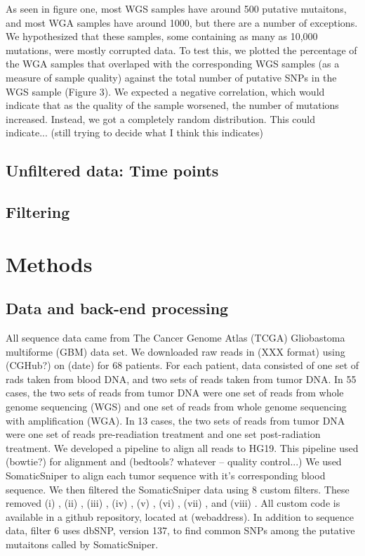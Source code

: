 \documentclass[11pt]{article} %
\begin{document}
As seen in figure one, most WGS samples have around 500 putative mutaitons, and most WGA samples have around 1000, but there are a number of exceptions. We hypothesized that these samples, some containing as many as 10,000 mutations, were mostly corrupted data. To test this, we plotted the percentage of the WGA samples that overlaped with the corresponding WGS samples (as a measure of sample quality) against the total number of putative SNPs in the WGS sample (Figure 3). We expected a negative correlation, which would indicate that as the quality of the sample worsened, the number of mutations increased. Instead, we got a completely random distribution. This could indicate... (still trying to decide what I think this indicates)

\subsection{Unfiltered data: Time points}

\subsection{Filtering}

\section{Methods}

\subsection{Data and back-end processing}

All sequence data came from The Cancer Genome Atlas (TCGA) Gliobastoma multiforme (GBM) data set. We downloaded raw reads in (XXX format) using (CGHub?) on (date) for 68 patients. For each patient, data consisted of one set of rads taken from blood DNA, and two sets of reads taken from tumor DNA. In 55 cases, the two sets of reads from tumor DNA were one set of reads from whole genome sequencing (WGS) and one set of reads from whole genome sequencing with amplification (WGA). In 13 cases, the two sets of reads from tumor DNA were one set of reads pre-readiation treatment and one set post-radiation treatment. We developed a pipeline to align all reads to HG19. This pipeline used (bowtie?) for alignment and (bedtools? whatever -- quality control...) We used SomaticSniper to align each tumor sequence with it's corresponding blood sequence. We then filtered the SomaticSniper data using 8 custom filters. These removed (i) , (ii) , (iii) , (iv) , (v) , (vi) , (vii) , and (viii) . All custom code is available in a github repository, located at (webaddress). In addition to sequence data, filter 6 uses dbSNP, version 137, to find common SNPs among the putative mutaitons called by SomaticSniper.
\end{document}
